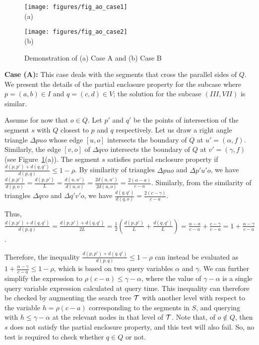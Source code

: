\begin{figure}[h]
\begin{minipage}[b]{0.5\linewidth}
\centering
\texttt{[image: figures/fig\_ao\_case1]}\\
(a)
\end{minipage}
\begin{minipage}[b]{0.5\linewidth}
\centering
\texttt{[image: figures/fig\_ao\_case2]}\\
(b)
\end{minipage}
\caption{Demonstration of (a) Case A and (b) Case B}
\label{fig:rectangles:ao:case12}
\end{figure}



{\bf Case (A):}
This case deals with the segments that cross the parallel sides of $Q$. 
We present the details of the partial enclosure property for the subcase 
where $p=(a,b) \in I$ and $q=(c,d) \in V$; the solution for the subcase 
$(III, VII)$ is similar.

Assume for now that $o \in Q$. Let 
$p'$ and $q'$ be the points of intersection of the segment $s$ with 
$Q$ closest to $p$  and $q$ respectively. Let us draw a right angle 
triangle $\Delta p u o$ whose edge $[u,o]$ intersects the boundary 
of $Q$ at $u'=(\alpha, f)$. Similarly, the edge $[v,o]$ of  
$\Delta q v o$  intersects the boundary of $Q$ at 
$v' = (\gamma, f)$ (see Figure~\ref{fig:rectangles:ao:case12}(a)). 
The segment $s$ satisfies partial enclosure property if 
$\frac{d(p, p') + d(q, q')}{d(p, q)} \leq 1 - \rho$. By similarity 
of triangles $\Delta puo$ and $\Delta p'u'o$, we have
$\frac{d(p, p')}{d(p, o)} = \frac{d(p, p')}{L} = 
\frac{d(u, u')}{d(u, o)} = \frac{2 d(u, u')}{2 d(u, o)} = 
\frac{2(\alpha - a)}{c - a}$. Similarly, from the similarity of 
triangles $\Delta qvo$ and $\Delta q'v'o$, we have
$\frac{d(q, q')}{d(q, o)} = \frac{2(c - \gamma)}{c - a}$.

Thus, $\frac{d(p,p')+d(q,q')}{d(p,q)}=\frac{d(p,p')+d(q,q')}{2L} = 
\frac{1}{2} \left ( \frac{d(p,p')}{L} + \frac{d(q,q')}{L} \right ) 
 = \frac{\alpha - a}{c - a} + \frac{c - \gamma}{c - a} 
= 1 + \frac{\alpha - \gamma}{c - a}$. 

Therefore, the inequality $\frac{d(p, p') + d(q, q')}{d(p, q)} 
\leq 1 - \rho$ can instead be evaluated as $1 + \frac{\alpha - 
\gamma}{c - a} \leq 1 - \rho$, which is based on two query 
variables $\alpha$ and $\gamma$. We can further simplify the 
expression to $\rho(c - a) \leq \gamma - \alpha$, where the value 
of $\gamma - \alpha$ is a single query variable expression 
calculated at query time. This inequality can therefore be checked 
by augmenting the search tree $\cal T$ with another level with 
respect to the variable $h=\rho(c-a)$ corresponding to the segments 
in $S$, and querying with $h \leq \gamma-\alpha$ at the relevant 
nodes in that level of $\cal T$. Note that, of $o \not\in Q$, then 
$s$ does not satisfy the partial enclosure property, and this test 
will also fail. So, no test is required to check whether $q \in Q$ 
or not.  



